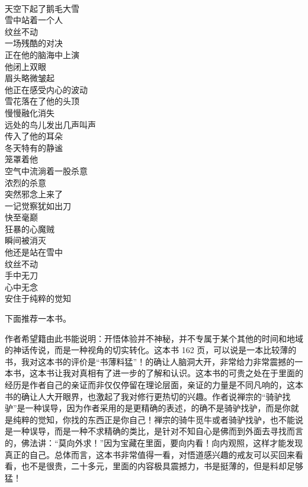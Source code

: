 \begin{poem}[壮哉杀念者]
    \begin{multicols}{2}
        \begin{center}~\\
            天空下起了鹅毛大雪 \\ 雪中站着一个人 \\ 纹丝不动 \\ 一场残酷的对决 \\ 正在他的脑海中上演 \\ 他闭上双眼 \\ 眉头略微皱起 \\ 他正在感受内心的波动 \\ 雪花落在了他的头顶 \\ 慢慢融化消失 \\ 远处的鸟儿发出几声叫声 \\ 传入了他的耳朵 \\ 冬天特有的静谧 \\ 笼罩着他 \\ 空气中流淌着一股杀意 \\ 浓烈的杀意 \\ 突然邪念上来了 \\ 一记觉察犹如出刀 \\ 快至毫巅 \\ 狂暴的心魔贼 \\ 瞬间被消灭 \\ 他还是站在雪中 \\ 纹丝不动 \\ 手中无刀 \\ 心中无念 \\ 安住于纯粹的觉知
        \end{center}
    \end{multicols}
\end{poem}

下面推荐一本书。

\begin{book}
    作者希望籍由此书能说明：开悟体验并不神秘，并不专属于某个其他的时间和地域的神话传说，而是一种视角的切实转化。这本书 162 页，可以说是一本比较薄的书，我对这本书的评价是“书薄料猛”！的确让人脑洞大开，非常给力非常震撼的一本书，这本书让我对真相有了进一步的了解和认识。这本书的可贵之处在于里面的经历是作者自己的亲证而非仅仅停留在理论层面，亲证的力量是不同凡响的，这本书的确让人大开眼界，也激起了我对修行更热切的兴趣。作者说禅宗的“骑驴找驴”是一种误导，因为作者采用的是更精确的表述，的确不是骑驴找驴，而是你就是纯粹的觉知，你找的东西正是你自己！禅宗的骑牛觅牛或者骑驴找驴，也不能说是一种误导，而是一种不求精确的类比，是针对不知自心是佛而到外面去寻找而言的，佛法讲：“莫向外求！”因为宝藏在里面，要向内看！向内观照，这样才能发现真正的自己。总体而言，这本书非常值得一看，对悟道感兴趣的戒友可以买回来看看，也不是很贵，二十多元，里面的内容极具震撼力，书是挺薄的，但是料却足够猛！
\end{book}
